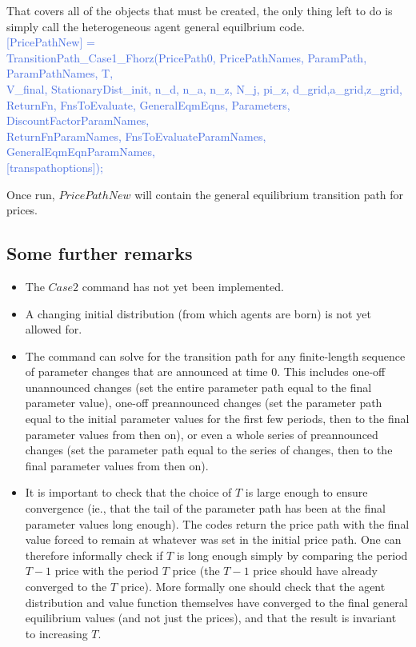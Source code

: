 That covers all of the objects that must be created, the only thing left to do is simply call the heterogeneous agent general equilbrium code. \\
\textcolor{RoyalBlue}{[PricePathNew] =} \\
\indent \textcolor{RoyalBlue}{  TransitionPath\_{}Case1\_{}Fhorz(PricePath0, PricePathNames, ParamPath, ParamPathNames, T, } \\
\indent \indent \textcolor{RoyalBlue}{   V\_{}final, StationaryDist\_{}init, n\_{}d, n\_{}a, n\_{}z, N\_{}j, pi\_{}z, d\_{}grid,a\_{}grid,z\_{}grid, } \\
\indent \indent \textcolor{RoyalBlue}{   ReturnFn, FnsToEvaluate, GeneralEqmEqns, Parameters, DiscountFactorParamNames, } \\
\indent \indent \textcolor{RoyalBlue}{   ReturnFnParamNames, FnsToEvaluateParamNames, GeneralEqmEqnParamNames,} \\
\indent \indent \textcolor{RoyalBlue}{   [transpathoptions]);}

Once run, $PricePathNew$ will contain the general equilibrium transition path for prices.

\subsection{Some further remarks}
\begin{itemize}
 \item The $Case2$ command has not yet been implemented.
 \item A changing initial distribution (from which agents are born) is not yet allowed for.
 \item The command can solve for the transition path for any finite-length sequence of parameter changes that are announced at time 0. This includes one-off unannounced
   changes (set the entire parameter path equal to the final parameter value), one-off preannounced changes (set the parameter path equal to the initial parameter values
   for the first few periods, then to the final parameter values from then on), or even a whole series of preannounced changes (set the parameter path equal to the series
   of changes, then to the final parameter values from then on).
 \item It is important to check that the choice of $T$ is large enough to ensure convergence (ie., that the tail of the parameter path has been at the final parameter values
   long enough). The codes return the price path with the final value forced to remain at whatever was set in the initial price path. One can therefore informally check if $T$ is long enough simply
   by comparing the period $T-1$ price with the period $T$ price (the $T-1$ price should have already converged to the $T$ price). More formally one should check that the agent distribution
   and value function themselves have converged to the final general equilibrium values (and not just the prices), and that the result is invariant to increasing $T$.
\end{itemize}

